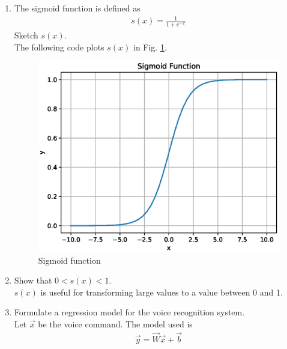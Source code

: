 \documentclass[journal,12pt,twocolumn]{IEEEtran}
\renewcommand\thesection{\arabic{section}}
\begin{document}
\begin{enumerate}[label=\thesection.\arabic*
,ref=\thesection.\theenumi]
\\
\solution See Table \ref{fig:ref_vec}.
\begin{table}[!ht]
\begin{center}

\end{center}
\caption{Reference vectors}
\label{fig:ref_vec}
\end{table}
%
\item The sigmoid function is defined as
\begin{align}
\label{eq:sig}
s(x) = \frac{1}{1+e^{-x}}
\end{align}
Sketch $s(x)$.
\\
\solution The following code plots $s(x)$ in Fig. \ref{fig:sigmoid}.
\begin{figure}[ht!]
\begin{center}
\includegraphics[width=\columnwidth]{./figs/sigmoid.eps}
\end{center}
\caption{Sigmoid function }
\label{fig:sigmoid}
\end{figure}
\item Show that $0 < s(x) < 1$.
\\
\solution $s(x)$ is useful for transforming large values to a value between 0 and 1.
\item Formulate a regression model for the voice recognition system.
\\
\solution Let $\vec{x}$ be the voice command. The model used is
\begin{align}
\label{eq:sig}
\vec{y} = \vec{W}\vec{x}+\vec{b}
\end{align}

\end{enumerate}
\end{document}
